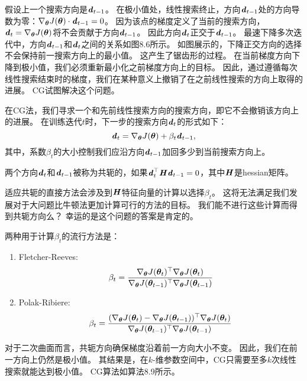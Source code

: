 假设上一个搜索方向是$\boldsymbol{\mathit{d}}_{t-1}$。   
在极小值处，线性搜索终止，方向$\boldsymbol{\mathit{d}}_{t-1}$处的方向导数为零：$\nabla_{\boldsymbol{\theta}} J(\boldsymbol{\theta}) \cdot \boldsymbol{\mathit{d}}_{t-1} = 0$。
因为该点的梯度定义了当前的搜索方向，$\boldsymbol{\mathit{d}}_t = \nabla_{\boldsymbol{\theta}} J(\boldsymbol{\theta})$将不会贡献于方向$\boldsymbol{\mathit{d}}_{t-1}$。
因此方向$\boldsymbol{\mathit{d}}_t$正交于$\boldsymbol{\mathit{d}}_{t-1}$。
最速下降多次迭代中，方向$\boldsymbol{\mathit{d}}_{t-1}$和$\boldsymbol{\mathit{d}}_t$之间的关系如图8.6所示。
如图展示的，下降正交方向的选择不会保持前一搜索方向上的最小值。
这产生了锯齿形的过程。
在当前梯度方向下降到极小值，我们必须重新最小化之前梯度方向上的目标。
因此，通过遵循每次线性搜索结束时的梯度，我们在某种意义上撤销了在之前线性搜索的方向上取得的进展。
\gls{CG}试图解决这个问题。

在\gls{CG}法，我们寻求一个和先前线性搜索方向的搜索方向，即它不会撤销该方向上的进展。
在训练迭代$t$时，下一步的搜索方向$\boldsymbol{\mathit{d}}_t$的形式如下：
\begin{equation}
    \boldsymbol{\mathit{d}}_t = \nabla_{\boldsymbol{\theta}} J(\boldsymbol{\theta}) + \beta_t \boldsymbol{\mathit{d}}_{t-1},
\end{equation}
其中，系数$\beta_t$的大小控制我们应沿方向$\boldsymbol{\mathit{d}}_{t-1}$加回多少到当前搜索方向上。


两个方向$\boldsymbol{\mathit{d}}_t$和$\boldsymbol{\mathit{d}}_{t-1}$被称为共轭的，如果$\boldsymbol{\mathit{d}}_t^\top \boldsymbol{\mathit{H}} \boldsymbol{\mathit{d}}_{t-1} = 0$，其中$\boldsymbol{\mathit{H}}$是\gls{hessian}矩阵。

适应共轭的直接方法会涉及到$\boldsymbol{\mathit{H}}$特征向量的计算以选择$\beta_t$。
这将无法满足我们发展对于大问题比牛顿法更加计算可行的方法的目标。
我们能不进行这些计算而得到共轭方向么？
幸运的是这个问题的答案是肯定的。

两种用于计算$\beta_t$的流行方法是：
\begin{enumerate}
\item Fletcher-Reeves:
\begin{equation}
    \beta_t = \frac{ \nabla_{\boldsymbol{\theta}} J(\boldsymbol{\theta}_t)^\top \nabla_{\boldsymbol{\theta}} J(\boldsymbol{\theta}_t) }
{ \nabla_{\boldsymbol{\theta}} J(\boldsymbol{\theta}_{t-1})^\top \nabla_{\boldsymbol{\theta}} J(\boldsymbol{\theta}_{t-1}) }
\end{equation}

\item Polak-Ribiere:
\begin{equation}
    \beta_t = \frac{ (\nabla_{\boldsymbol{\theta}} J(\boldsymbol{\theta}_t) - \nabla_{\boldsymbol{\theta}} J(\boldsymbol{\theta}_{t-1}))^\top \nabla_{\boldsymbol{\theta}} J(\boldsymbol{\theta}_t) }
{ \nabla_{\boldsymbol{\theta}} J(\boldsymbol{\theta}_{t-1})^\top \nabla_{\boldsymbol{\theta}} J(\boldsymbol{\theta}_{t-1}) }
\end{equation}
\end{enumerate}
对于二次曲面而言，共轭方向确保梯度沿着前一方向大小不变。
因此，我们在前一方向上仍然是极小值。
其结果是，在$k$-维参数空间中，\gls{CG}只需要至多$k$次线性搜索就能达到极小值。
\gls{CG}算法如算法8.9所示。

